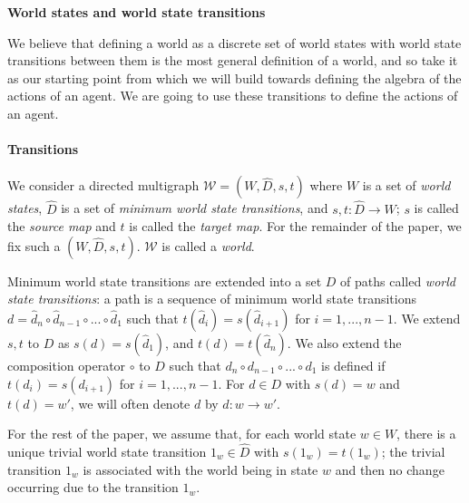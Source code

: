 \textbf{World states and world state transitions}

We believe that defining a world as a discrete set of world states with world state transitions between them is the most general definition of a world, and so take it as our starting point from which we will build towards defining the algebra of the actions of an agent.
We are going to use these transitions to define the actions of an agent.

\paragraph{Transitions}
We consider a directed multigraph $\mathscr{W} = (W, \hat{D}, s, t)$ where $W$ is a set of \textit{world states}, $\hat{D}$ is a set of \textit{minimum world state transitions}, and $s,t: \hat{D} \to W$; $s$ is called the \textit{source map} and $t$ is called the \textit{target map}.
For the remainder of the paper, we fix such a $(W, \hat{D}, s, t)$.
$\mathscr{W}$ is called a \textit{world}.

Minimum world state transitions are extended into a set $D$ of paths called \textit{world state transitions}: a path is a sequence of minimum world state transitions $d = \hat{d}_{n} \circ \hat{d}_{n-1} \circ ... \circ \hat{d}_{1}$ such that $t(\hat{d}_{i}) = s(\hat{d}_{i+1})$ for $i = 1, ..., n-1$.
We extend $s, t$ to $D$ as $s(d) = s(\hat{d}_{1})$, and $t(d) = t(\hat{d}_{n})$.
We also extend the composition operator $\circ$ to $D$ such that $d_{n} \circ d_{n-1} \circ ... \circ d_{1}$ is defined if $t({d}_{i}) = s({d}_{i+1})$ for $i = 1, ..., n-1$.
For $d \in D$ with $s(d) = w$ and $t(d) = w'$, we will often denote $d$ by $d: w \to w'$.

For the rest of the paper, we assume that, for each world state $w \in W$, there is a unique trivial world state transition $1_{w} \in \hat{D}$ with $s(1_{w}) = t(1_{w})$; the trivial transition $1_{w}$ is associated with the world being in state $w$ and then no change occurring due to the transition $1_{w}$.

